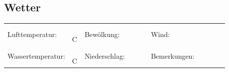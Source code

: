 \documentclass[a4paper, notitlepage, 10pt]{scrreprt}
\newcommand{\phantomspace}{\vphantom{A}}
\begin{document}
\begin{minipage}{\linewidth}
\subsection*{Wetter}
\renewcommand{\arraystretch}{1.2}
\begin{tabular}{>{\raggedright}p{0.155\linewidth}>{\raggedright}p{0.06\linewidth}>{\raggedright}p{0.11\linewidth}
                 >{\raggedright}p{0.175\linewidth}>{\raggedright}p{0.115\linewidth}
                 >{\raggedright\arraybackslash}p{0.265\linewidth}}
Lufttemperatur: & \phantomspace\uline{\hfill}\,\textdegree{}C & Bewölkung: & \phantomspace\uline{\hfill} & Wind: &
\phantomspace\uline{\hfill} \\
Wassertemperatur: & \phantomspace\uline{\hfill}\,\textdegree{}C & Niederschlag: & \phantomspace\uline{\hfill} &
Bemerkungen: & \parbox[t]{\linewidth}{\phantomspace\uline{\hfill}\newline{}\phantomspace\uline{\hfill}}
\end{tabular}
\end{minipage}
\vspace{7pt}
\vfill
\end{document}
